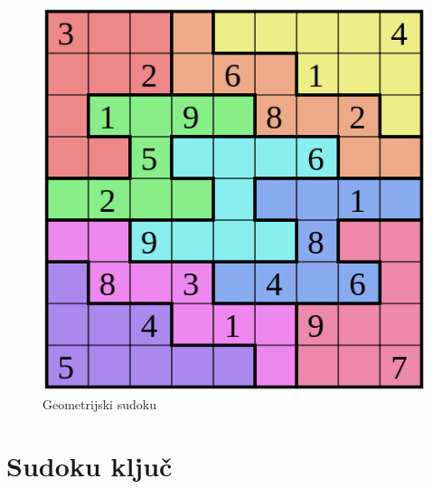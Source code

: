 \documentclass[A4paper, 11pt]{article}
\begin{document}
\begin{figure}[h]
\centering
\caption{Geometrijski sudoku}
\includegraphics[scale=0.4]{geo_sudoku}
\end{figure}


\section{Sudoku ključ}
\end{document}
